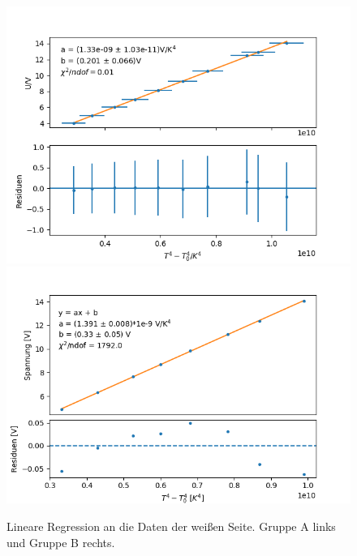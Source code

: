 \documentclass[12pt,a4paper]{article}
\begin{document}
\begin{figure}
\centering
\includegraphics[scale=0.5]{Bilder/Weiss_A}
\includegraphics[scale=0.5]{Bilder/weiss_B}
\caption{Lineare Regression an die Daten der weißen Seite. Gruppe A links und Gruppe B rechts.}
\label{fig:RegWeiss}
\end{figure}
\end{document}
